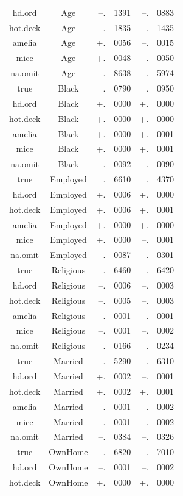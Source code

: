 \documentclass[12pt,econ]{sources/authesis}
\begin{document}
\begin{longtable}{ccr@{}lr@{}l}
 hd.ord & Age & --.&1391 & --.&0883 \\ 
 hot.deck & Age & --.&1835 & --.&1435 \\
 amelia & Age & +.&0056 & --.&0015 \\ 
 mice & Age & +.&0048 & --.&0050 \\ 
 na.omit & Age & --.&8638 & --.&5974 \\
 true & Black & .&0790 & .&0950 \\ 
 hd.ord & Black & +.&0000 & +.&0000 \\
 hot.deck & Black & +.&0000 & +.&0000 \\ 
 amelia & Black & +.&0000 & +.&0001 \\
 mice & Black & +.&0000 & +.&0001 \\ 
 na.omit & Black & --.&0092 & --.&0090 \\
 true & Employed & .&6610 & .&4370 \\ 
 hd.ord & Employed & +.&0006 & +.&0000 \\ 
 hot.deck & Employed & +.&0006 & +.&0001 \\
 amelia & Employed & +.&0000 & +.&0000 \\
 mice & Employed & +.&0000 & --.&0001 \\
 na.omit & Employed & --.&0087 & --.&0301 \\
 true & Religious & .&6460 & .&6420 \\ 
 hd.ord & Religious & --.&0006 & --.&0003 \\ 
 hot.deck & Religious & --.&0005 & --.&0003 \\
 amelia & Religious & --.&0001 & --.&0001 \\
 mice & Religious & --.&0001 & --.&0002 \\ 
 na.omit & Religious & --.&0166 & --.&0234 \\ 
 true & Married & .&5290 & .&6310 \\
 hd.ord & Married & +.&0002 & --.&0001 \\
 hot.deck & Married & +.&0002 & +.&0001 \\
 amelia & Married & --.&0001 & --.&0002 \\
 mice & Married & --.&0001 & --.&0002 \\ 
 na.omit & Married & --.&0384 & --.&0326 \\ 
 true & OwnHome & .&6820 & .&7010 \\
 hd.ord & OwnHome & --.&0001 & --.&0002 \\ 
 hot.deck & OwnHome & +.&0000 & +.&0000 \\ 

\end{longtable}
\end{document}
